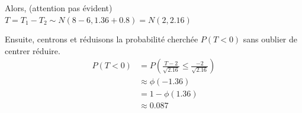 \begin{exo}
\begin{center}
		Alors, (attention pas évident)\\
		$T = T_1 - T_2 \sim N\left(8-6, 1.36 + 0.8\right) = N(2,2.16)$
	\end{center}
		Ensuite, centrons et réduisons la probabilité cherchée $P(T < 0)$ sans oublier de centrer réduire.
		\begin{align*}
			P(T < 0) & = P\left(\frac{T-2}{\sqrt{2.16}} \leq \frac{-2}{\sqrt{2.16}}\right) \\
			&\approx \phi(-1.36) \\
			&= 1- \phi(1.36) \\
			&\approx 0.087
		\end{align*}
\end{exo}
